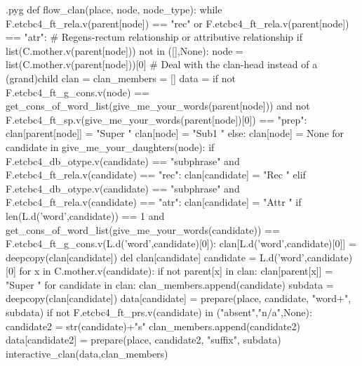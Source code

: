 \documentclass{report}
\makeatletter
\newenvironment{python}{%
  \VerbatimEnvironment
  \minted@resetoptions
  \setkeys{minted@opt}{}
      \begin{VerbatimOut}{\jobname.pyg}}
{%
      \end{VerbatimOut}
      \minted@pygmentize{python}
      \DeleteFile{\jobname.pyg}}
\makeatother
\begin{document}
\begin{python}
def flow_clan(place, node, node_type):
    while F.etcbc4_ft_rela.v(parent[node]) == "rec" or F.etcbc4_ft_rela.v(parent[node]) == "atr": # Regens-rectum relationship or attributive relationship
        if list(C.mother.v(parent[node])) not in ([],None):
            node = list(C.mother.v(parent[node]))[0] # Deal with the clan-head instead of a (grand)child
    clan = {}
    clan_members = []
    data = {}
    if not F.etcbc4_ft_g_cons.v(node) == get_cons_of_word_list(give_me_your_words(parent[node])) and not F.etcbc4_ft_sp.v(give_me_your_words(parent[node])[0]) == "prep":
        clan[parent[node]] = "Super "
        clan[node] = "Sub1 "
    else:
        clan[node] = None
    for candidate in give_me_your_daughters(node):
        if F.etcbc4_db_otype.v(candidate) == "subphrase" and F.etcbc4_ft_rela.v(candidate) == "rec":
            clan[candidate] = "Rec "
        elif F.etcbc4_db_otype.v(candidate) == "subphrase" and F.etcbc4_ft_rela.v(candidate) == "atr":
            clan[candidate] = "Attr "
        if len(L.d('word',candidate)) == 1 and get_cons_of_word_list(give_me_your_words(candidate)) == F.etcbc4_ft_g_cons.v(L.d('word',candidate)[0]):
            clan[L.d('word',candidate)[0]] = deepcopy(clan[candidate])
            del clan[candidate]
            candidate = L.d('word',candidate)[0] 
        for x in C.mother.v(candidate):
            if not parent[x] in clan:
                clan[parent[x]] = "Super "
    for candidate in clan:
        clan_members.append(candidate)
        subdata = deepcopy(clan[candidate])
        data[candidate] = prepare(place, candidate, "word+", subdata)
        if not F.etcbc4_ft_prs.v(candidate) in ("absent","n/a",None):
            candidate2 = str(candidate)+"s"
            clan_members.append(candidate2)
            data[candidate2] = prepare(place, candidate2, "suffix", subdata)
    interactive_clan(data,clan_members)

\end{python}
\end{document}
